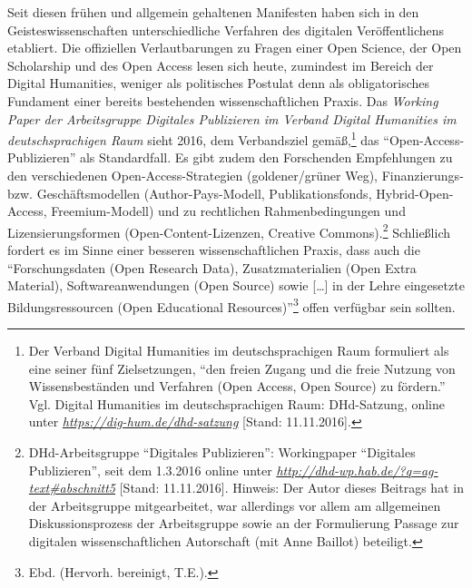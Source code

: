 \documentclass[a4paper,
fontsize=11pt,
oneside,
numbers=noperiodatend,
parskip=half-,
bibliography=totoc,
final
]{scrartcl}
\begin{document}
Seit diesen frühen und allgemein gehaltenen Manifesten haben sich in den
Geisteswissenschaften unterschiedliche Verfahren des digitalen
Veröffentlichens etabliert. Die offiziellen Verlautbarungen zu Fragen
einer Open Science, der Open Scholarship und des Open Access lesen sich
heute, zumindest im Bereich der Digital Humanities, weniger als
politisches Postulat denn als obligatorisches Fundament einer bereits
bestehenden wissenschaftlichen Praxis. Das \emph{Working Paper der
Arbeitsgruppe Digitales Publizieren im Verband Digital Humanities im
deutschsprachigen Raum} sieht 2016, dem Verbandsziel gemäß,\footnote{Der
  Verband Digital Humanities im deutschsprachigen Raum formuliert als
  eine seiner fünf Zielsetzungen, \enquote{den freien Zugang und die
  freie Nutzung von Wissensbeständen und Verfahren (Open Access, Open
  Source) zu fördern.} Vgl. Digital Humanities im deutschsprachigen
  Raum: DHd-Satzung, online unter
  \href{https://dig-hum.de/dhd-satzung}{\emph{https://dig-hum.de/dhd-satzung}}
  {[}Stand: 11.11.2016{]}.} das \enquote{Open-Access-Publizieren} als
Standardfall. Es gibt zudem den Forschenden Empfehlungen zu den
verschiedenen Open-Access-Strategien (goldener/grüner Weg),
Finanzierungs- bzw. Geschäftsmodellen (Author-Pays-Modell,
Publikationsfonds, Hybrid-Open-Access, Freemium-Modell) und zu
rechtlichen Rahmenbedingungen und Lizensierungsformen
(Open-Content-Lizenzen, Creative Commons).\footnote{DHd-Arbeitsgruppe
  \enquote{Digitales Publizieren}: Workingpaper \enquote{Digitales
  Publizieren}, seit dem 1.3.2016 online unter
  \href{http://dhd-wp.hab.de/?q=ag-text\#abschnitt5}{\emph{http://dhd-wp.hab.de/?q=ag-text\#abschnitt5}}
  {[}Stand: 11.11.2016{]}. Hinweis: Der Autor dieses Beitrags hat in der
  Arbeitsgruppe mitgearbeitet, war allerdings vor allem am allgemeinen
  Diskussionsprozess der Arbeitsgruppe sowie an der Formulierung Passage
  zur digitalen wissenschaftlichen Autorschaft (mit Anne Baillot)
  beteiligt.} Schließlich fordert es im Sinne einer besseren
wissenschaftlichen Praxis, dass auch die \enquote{Forschungsdaten (Open
Research Data), Zusatzmaterialien (Open Extra Material),
Softwareanwendungen (Open Source) sowie {[}\ldots{}{]} in der Lehre
eingesetzte Bildungsressourcen (Open Educational Resources)}\footnote{Ebd.
  (Hervorh. bereinigt, T.E.).} offen verfügbar sein sollten.
\end{document}
